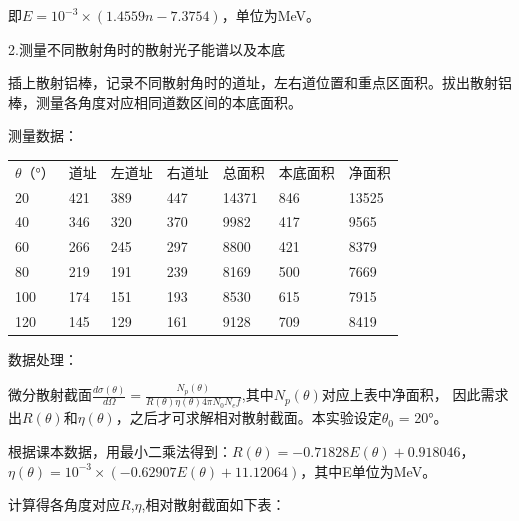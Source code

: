 \documentclass[font=default]{mpltx}
\begin{document}
即$E = {10}^{-3} \times (1.4559n - 7.3754)$，单位为MeV。

2.测量不同散射角时的散射光子能谱以及本底

插上散射铝棒，记录不同散射角时的道址，左右道位置和重点区面积。拔出散射铝棒，测量各角度对应相同道数区间的本底面积。

测量数据：
\begin{table}[]
\begin{tabular}{llll}
$\theta$（°）         & 道址                 &左道址            &右道址          &总面积    &本底面积    &净面积 \\
20                   & 421                  &389                &447            &14371    &846        &13525 \\
40                   & 346                   &320                &370           &9982     &417        &9565 \\
60                   & 266                   &245                &297           &8800     &421        &8379  \\
80                   & 219                  &191                  &239          &8169     &500        &7669  \\
100                  & 174                  &151                 &193           &8530     &615        &7915  \\
120                  &145                   &129                 &161           &9128     &709        &8419  \\
\end{tabular}
\end{table}

数据处理：

微分散射截面$\frac{d \sigma (\theta)}{d \Omega} = \frac{N_p(\theta)}{R(\theta)\eta(\theta)4 \pi N_0 N_e f}$,其中$N_p(\theta)$对应上表中净面积，
因此需求出$R(\theta)$和$\eta(\theta)$，之后才可求解相对散射截面。本实验设定$\theta_0$ = 20°。

根据课本数据，用最小二乘法得到：$R(\theta) =-0.71828 E(\theta) + 0.918046$，
$\eta(\theta) = 10^{-3} \times (-0.62907E(\theta) + 11.12064)$，其中E单位为MeV。

计算得各角度对应$R$,$\eta$,相对散射截面如下表：
\end{document}
